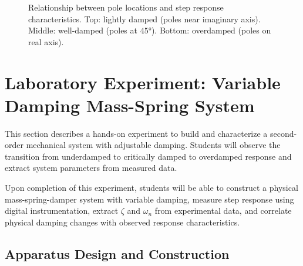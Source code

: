 \begin{figure}[H]
\caption{Relationship between pole locations and step response characteristics. Top: lightly damped (poles near imaginary axis). Middle: well-damped (poles at $45°$). Bottom: overdamped (poles on real axis).}
\label{fig:poles_responses}
\end{figure}

\section{Laboratory Experiment: Variable Damping Mass-Spring System}

This section describes a hands-on experiment to build and characterize a second-order mechanical system with adjustable damping. Students will observe the transition from underdamped to critically damped to overdamped response and extract system parameters from measured data.

\begin{experimentbox}
Upon completion of this experiment, students will be able to construct a physical mass-spring-damper system with variable damping, measure step response using digital instrumentation, extract $\zeta$ and $\omega_n$ from experimental data, and correlate physical damping changes with observed response characteristics.
\end{experimentbox}

\subsection{Apparatus Design and Construction}

